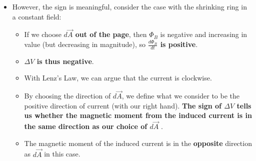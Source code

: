 \documentclass[aspectratio=169,
hyperref={colorlinks,urlcolor=blue}
]{beamer}
\begin{document}
{
\begin{itemize}
\item However, the sign is meaningful, consider the case with the shrinking ring in a constant field:
\begin{itemize}
\item If we choose \textbf{$d\vec A$ out of the page}, then $\Phi_B$ is negative and increasing in value (but decreasing in magnitude), so \textbf{$\frac{d\Phi_B}{dt} $ is positive}.
\item \textbf{\color{qred}$\Delta V$ is thus negative}. 
\item With Lenz’s Law, we can argue that the current is clockwise. 
\item By choosing the direction of $d\vec A$, we define what we consider to be the positive direction of current (with our right hand). \textbf{The sign of $\Delta V$ tells us whether the magnetic moment from the induced current is in the same direction as our choice of $d\vec A$ }.
\item The magnetic moment of the induced current is in the \textbf{\color{qred}opposite} direction as $d\vec A$ in this case.
\end{itemize}
\end{itemize}
}
\end{document}
